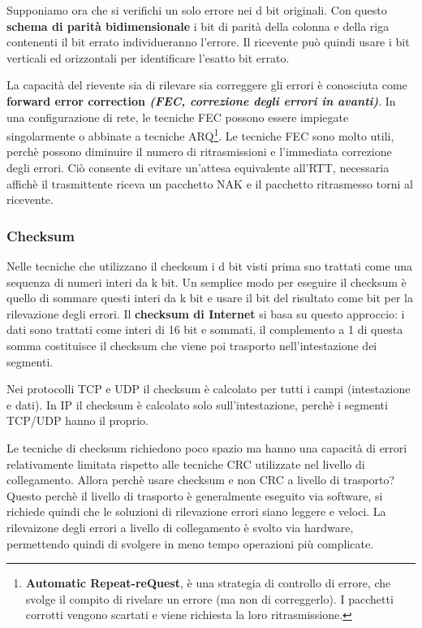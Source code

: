 \documentclass[11pt,a4paper]{article}
\begin{document}
Supponiamo ora che si verifichi un solo errore nei d bit originali. Con questo \textbf{schema di parità bidimensionale} i bit di parità della colonna e della riga contenenti il bit errato individueranno l'errore. Il ricevente può quindi usare i bit verticali ed orizzontali per identificare l'esatto bit errato.

La capacità del rievente sia di rilevare sia correggere gli errori è conosciuta come \textbf{forward error correction \textit{(FEC, correzione degli errori in avanti)}}. In una configurazione di rete, le tecniche FEC possono essere impiegate singolarmente o abbinate a tecniche ARQ\footnote{\textbf{Automatic Repeat-reQuest}, è una strategia di controllo di errore, che svolge il compito di rivelare un errore (ma non di correggerlo). I pacchetti corrotti vengono scartati e viene richiesta la loro ritrasmissione.}. Le tecniche FEC sono molto utili, perchè possono diminuire il numero di ritrasmissioni e l'immediata correzione degli errori. Ciò consente di evitare un'attesa equivalente all'RTT, necessaria affichè il trasmittente riceva un pacchetto NAK e il pacchetto ritrasmesso torni al ricevente.

\subsubsection{Checksum}
Nelle tecniche che utilizzano il checksum i d bit visti prima sno trattati come una sequenza di numeri interi da k bit. Un semplice modo per eseguire il checksum è quello di sommare questi interi da k bit e usare il bit del risultato come bit per la rilevazione degli errori. Il \textbf{checksum di Internet} si basa su questo approccio: i dati sono trattati come interi di 16 bit e sommati, il complemento a 1 di questa somma costituisce il checksum che viene poi trasporto nell'intestazione dei segmenti.

Nei protocolli TCP e UDP il checksum è calcolato per tutti i campi (intestazione e dati). In IP il checksum è calcolato solo sull'intestazione, perchè i segmenti TCP/UDP hanno il proprio.

Le tecniche di checksum richiedono poco spazio ma hanno una capacità di errori relativamente limitata rispetto alle tecniche CRC utilizzate nel livello di collegamento. Allora perchè usare checksum e non CRC a livello di trasporto? Questo perchè il livello di trasporto è generalmente eseguito via software, si richiede quindi che le soluzioni di rilevazione errori siano leggere e veloci. La rilevaizone degli errori a livello di collegamento è svolto via hardware, permettendo quindi di svolgere in meno tempo operazioni più complicate.
\end{document}
